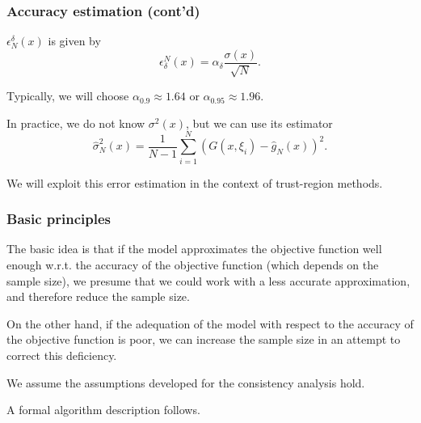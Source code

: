 \documentclass{beamer}
\begin{document}
\begin{frame}
\frametitle{Accuracy estimation (cont'd)}

$\epsilon^{\delta}_N(x)$ is given by
\[
\epsilon_{\delta}^N(x) = \alpha_{\delta} \frac{\sigma(x)}{\sqrt{N}}.
\]

\mbox{}

Typically, we will choose $\alpha_{0.9} \approx 1.64$ or $\alpha_{0.95} \approx 1.96$.

\mbox{}

In practice, we do not know $\sigma^2(x)$, but we can use its estimator
\[
\hat{\sigma}^2_N(x) = \frac{1}{N-1}\sum_{i = 1}^N ( G(x,\xi_i) -
\hat{g}_N(x))^2.
\]

\mbox{}

We will exploit this error estimation in the context of trust-region methods.


\end{frame}

\begin{frame}
\frametitle{Basic principles}

The basic idea is that if the model approximates the objective function well enough w.r.t. the accuracy of the objective function (which depends on the sample size), we presume that we could work with a less accurate approximation, and therefore reduce the sample size.

\mbox{}

On the other hand, if the adequation of the model with respect to the accuracy of the objective function is poor, we can increase the sample size in an attempt to correct this deficiency.

\mbox{}

We assume the assumptions developed for the consistency analysis hold.

\mbox{}

A formal algorithm description follows.

\end{frame}
\end{document}
